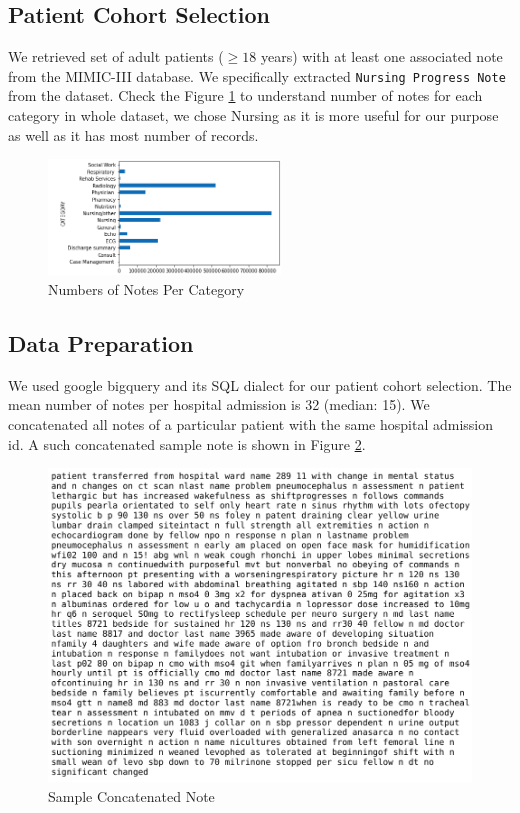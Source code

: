 \documentclass[11pt,a4paper]{article}
\begin{document}
\subsection{Patient Cohort Selection}

We retrieved set of adult patients ($\geq 18$ years) with at least one associated
note from the MIMIC-III database. We specifically extracted \texttt{Nursing Progress Note} from the dataset. Check the Figure \ref{data} to understand number of notes for each category in whole dataset, we chose Nursing as it is more useful for our purpose as well as it has most number of records. 
\begin{figure}[h!]
	\centering
		\centering
		\includegraphics[width=0.55\textwidth]{notes.png}
			\caption{Numbers of Notes Per Category}
	\label{data}
\end{figure}

\subsection{Data Preparation}
We used google bigquery and its SQL dialect for our patient cohort selection. The mean number of notes per hospital admission is 32 (median: 15). We concatenated all notes of a particular patient with the same hospital admission id. A such concatenated sample note is shown in Figure  \ref{fig:note}.
\begin{figure}[h!]
	\label{note.pdf}
	\centering
	\includegraphics[width=0.84\linewidth]{note.pdf}
	\caption{Sample Concatenated Note}
	\label{fig:note}
\end{figure}
\end{document}
